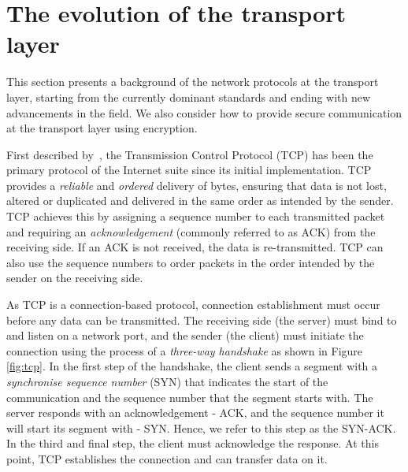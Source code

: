 \section{The evolution of the transport layer}

This section presents a background of the network protocols at the transport layer, starting from the currently dominant standards and ending with new advancements in the field.
We also consider how to provide secure communication at the transport layer using encryption.

First described by~\citet{cerf_protocol_1974}, the Transmission Control Protocol (TCP) has been the primary protocol of the Internet suite since its initial implementation.
TCP provides a \textit{reliable} and \textit{ordered} delivery of bytes, ensuring that data is not lost, altered or duplicated and delivered in the same order as intended by the sender.
TCP achieves this by assigning a sequence number to each transmitted packet and requiring an \textit{acknowledgement} (commonly referred to as ACK) from the receiving side.
If an ACK is not received, the data is re-transmitted.
TCP can also use the sequence numbers to order packets in the order intended by the sender on the receiving side.

As TCP is a connection-based protocol, connection establishment must occur before any data can be transmitted.
The receiving side (the server) must bind to and listen on a network port, and the sender (the client) must initiate the connection using the process of a \textit{three-way handshake} as shown in Figure \ref{fig:tcp}.
In the first step of the handshake, the client sends a segment with a \textit{synchronise sequence number} (SYN) that indicates the start of the communication and the sequence number that the segment starts with.
The server responds with an acknowledgement - ACK, and the sequence number it will start its segment with - SYN.
Hence, we refer to this step as the SYN-ACK.
In the third and final step, the client must acknowledge the response.
At this point, TCP establishes the connection and can transfer data on it.

